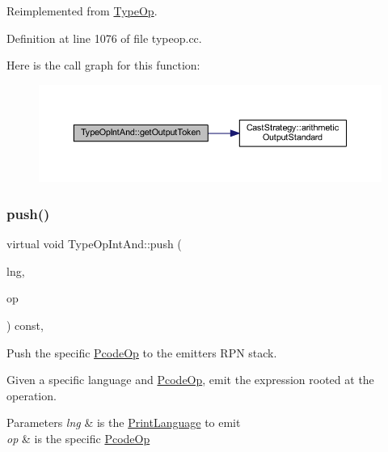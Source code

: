 Reimplemented from \mbox{\hyperlink{class_type_op_a7150ac93bb03a993735c829deb5237e7}{Type\+Op}}.



Definition at line 1076 of file typeop.\+cc.

Here is the call graph for this function\+:
\nopagebreak
\begin{figure}[H]
\begin{center}
\leavevmode
\includegraphics[width=350pt]{class_type_op_int_and_a4f06c12390fbbad57e41537047666e2d_cgraph}
\end{center}
\end{figure}
\mbox{\label{class_type_op_int_and_a589ee5be6f2e2b381a0c389b47fff39f}} 
\subsubsection{\texorpdfstring{push()}{push()}}
{\footnotesize\ttfamily virtual void Type\+Op\+Int\+And\+::push (\begin{DoxyParamCaption}\item[{\mbox{\hyperlink{class_print_language}{Print\+Language}} $\ast$}]{lng,  }\item[{const \mbox{\hyperlink{class_pcode_op}{Pcode\+Op}} $\ast$}]{op }\end{DoxyParamCaption}) const\hspace{0.3cm}{\ttfamily [inline]}, {\ttfamily [virtual]}}



Push the specific \mbox{\hyperlink{class_pcode_op}{Pcode\+Op}} to the emitter\textquotesingle{}s R\+PN stack. 

Given a specific language and \mbox{\hyperlink{class_pcode_op}{Pcode\+Op}}, emit the expression rooted at the operation. 
\begin{DoxyParams}{Parameters}
{\em lng} & is the \mbox{\hyperlink{class_print_language}{Print\+Language}} to emit \\
\hline
{\em op} & is the specific \mbox{\hyperlink{class_pcode_op}{Pcode\+Op}} \\
\hline
\end{DoxyParams}


